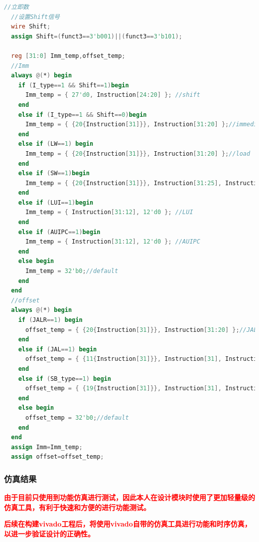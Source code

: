 \documentclass[12pt,hyperref,a4paper,UTF8]{ctexart}
\begin{document}
\begin{lstlisting}[language=Verilog,caption=立即数]
  //立即数
  //设置Shift信号
  wire Shift;
  assign Shift=(funct3==3'b001)||(funct3==3'b101);

  reg [31:0] Imm_temp,offset_temp;
  //Imm
  always @(*) begin
    if (I_type==1 && Shift==1)begin
      Imm_temp = { 27'd0, Instruction[24:20] }; //shift
    end
    else if (I_type==1 && Shift==0)begin
      Imm_temp = { {20{Instruction[31]}}, Instruction[31:20] };//immediate
    end
    else if (LW==1) begin
      Imm_temp = { {20{Instruction[31]}}, Instruction[31:20] };//load
    end
    else if (SW==1)begin
      Imm_temp = { {20{Instruction[31]}}, Instruction[31:25], Instruction[11:7] }; //store
    end
    else if (LUI==1)begin
      Imm_temp = { Instruction[31:12], 12'd0 }; //LUI
    end
    else if (AUIPC==1)begin
      Imm_temp = { Instruction[31:12], 12'd0 }; //AUIPC
    end
    else begin
      Imm_temp = 32'b0;//default
    end
  end
  //offset
  always @(*) begin
    if (JALR==1) begin
      offset_temp = { {20{Instruction[31]}}, Instruction[31:20] };//JALR
    end
    else if (JAL==1) begin
      offset_temp = { {11{Instruction[31]}}, Instruction[31], Instruction[19:12], Instruction[20], Instruction[30:21], 1'b0 };//JAL
    end
    else if (SB_type==1) begin
      offset_temp = { {19{Instruction[31]}}, Instruction[31], Instruction[7], Instruction[30:25], Instruction[11:8], 1'b0 };//SB
    end
    else begin
      offset_temp = 32'b0;//default
    end
  end
  assign Imm=Imm_temp;
  assign offset=offset_temp;
\end{lstlisting}

\subsubsection*
{\Large 仿真结果}
\normalsize

\textcolor{red}{\textbf{由于目前只使用到功能仿真进行测试，因此本人在设计模块时使用了更加轻量级的仿真工具，有利于快速和方便的进行功能测试。}}

\textcolor{red}{\textbf{后续在构建vivado工程后，将使用vivado自带的仿真工具进行功能和时序仿真，以进一步验证设计的正确性。}}
\end{document}

